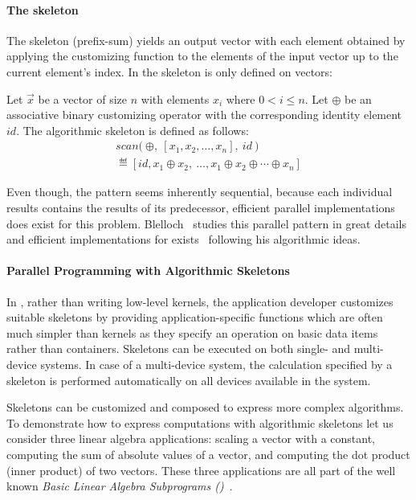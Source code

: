 \paragraph{The \scan skeleton}
The \scan skeleton (\aka prefix-sum) yields an output vector with each element obtained by applying the customizing function to the elements of the input vector up to the current element's index.
In \SkelCL the \scan skeleton is only defined on vectors:
\begin{definition}
  \label{definition:scan}
  Let $\vec{x}$ be a vector of size $n$ with elements $x_i$ where $0 < i \leq n$.
  Let $\oplus$ be an associative binary customizing operator with the corresponding identity element $id$.
  The algorithmic skeleton \scan is defined as follows:
  \begin{equation*}
    \begin{split}
    scan \big(\ \oplus,\ [x_1, x_2, \dots, x_n],\ id\ \big) \\
      \eqdef [id, x_1 \oplus x_2,\ \dots,x_1 \oplus x_2 \oplus \cdots \oplus x_n]
    \end{split}
  \end{equation*}
\end{definition}
\noindent
Even though, the \scan pattern seems inherently sequential, because each individual results contains the results of its predecessor, efficient parallel implementations does exist for this problem.
Blelloch~\cite{Blelloch1991} studies this parallel pattern in great details and efficient implementations for \GPUs exists~\cite{HarrisSeOw2007} following his algorithmic ideas.


\paragraph{Parallel Programming with Algorithmic Skeletons}
In \SkelCL, rather than writing low-level kernels, the application developer customizes suitable skeletons by providing application-specific functions which are often much simpler than kernels as they specify an operation on basic data items rather than containers.
Skeletons can be executed on both single- and multi-device systems.
In case of a multi-device system, the calculation specified by a skeleton is performed automatically on all devices available in the system.

Skeletons can be customized and composed to express more complex algorithms.
To demonstrate how to express computations with algorithmic skeletons let us consider three linear algebra applications:
scaling a vector with a constant, computing the sum of absolute values of a vector, and computing the dot product (\aka inner product) of two vectors.
These three applications are all part of the well known \emph{Basic Linear Algebra Subprograms (\BLAS)}~\cite{Dongarra2002,Dongarra2002a}.

